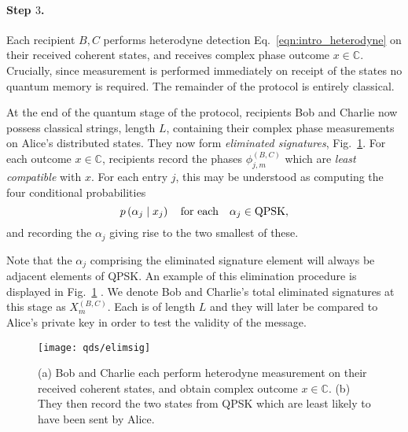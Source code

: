 \paragraph{Step $3$.}
Each recipient $B, C$ performs heterodyne detection Eq.~\ref{eqn:intro_heterodyne} on their received coherent states, and receives complex phase outcome $x \in \mathbb{C}$. Crucially, since measurement is performed immediately on receipt of the states no quantum memory is required. The remainder of the protocol is entirely classical.

\iffalse
%
%
each received $\rho\left[\phi_{j, m}^{\left(B, C\right)}\right]$ and receives complex phase outcome $x_{B,C}\in\mathbb{C}$. In other words, they perform the POVM
\begin{equation}
E\left[x\right] := \otimes_{j=1}^L E_j\left[x\right] \qq{with} E_j\left[x\right] := \frac{1}{\sqrt{\pi}} \ket{x}_j\bra{x}_j
\end{equation}
with $x \in \mathbb{C}$. 
\fi


At the end of the quantum stage of the protocol, recipients Bob and Charlie now possess classical strings, length $L$, containing their complex phase measurements on Alice's distributed states. They now form \emph{eliminated signatures}, Fig.~\ref{fig:elimsig}. For each outcome $x \in\mathbb{C}$, recipients record the phases $\phi_{j, m}^{\left(B, C\right)}$ which are \emph{least compatible} with $x$. For each entry $j$, this may be understood as computing the four conditional probabilities 
\begin{equation}
p\left(\alpha_j \given x_j\right) \qq{for each} \alpha_j \in \text{QPSK},
\end{equation}
and recording the $\alpha_j$ giving rise to the two smallest of these.

Note that the $\alpha_j$ comprising the eliminated signature element will always be adjacent elements of QPSK. An example of this elimination procedure is displayed in Fig.~\ref{fig:elimsig}
. We denote Bob and Charlie's total eliminated signatures at this stage as $X_m^{\left(B, C\right)}$. Each is of length $L$ and they will later be compared to Alice's private key in order to test the validity of the message.

\begin{figure}[htp]
\centering
\texttt{[image: qds/elimsig]}
\caption{\label{fig:elimsig} (a) Bob and Charlie each perform heterodyne measurement on their received coherent states, and obtain complex outcome $x \in \mathbb{C}$. (b) They then record the two states from QPSK which are least likely to have been sent by Alice.}
\end{figure}

